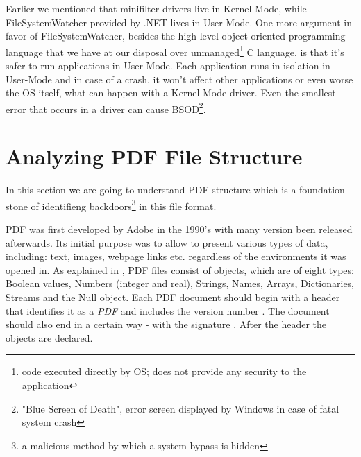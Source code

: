 Earlier we mentioned that minifilter drivers live in Kernel-Mode, while FileSystemWatcher provided by .NET lives in User-Mode. One more argument in favor of FileSystemWatcher, besides the high level object-oriented programming language \CSharp that we have at our disposal over unmanaged\footnote{code executed directly by OS; does not provide any security to the application} C language, is that it's safer to run applications in User-Mode. Each application runs in isolation in User-Mode and in case of a crash, it won't affect other applications or even worse the OS itself, what can happen with a Kernel-Mode driver. Even the smallest error that occurs in a driver can cause BSOD\footnote{"Blue Screen of Death", error screen displayed by Windows in case of fatal system crash}. 

\newpage
\section{Analyzing PDF File Structure}
\label{section:pdfStructure}
In this section we are going to understand PDF structure which is a foundation stone of identifieng backdoors\footnote{a malicious method by which a system bypass is hidden} in this file format. \par
PDF was first developed by Adobe in the 1990's with many version been released afterwards. Its initial purpose was to allow to present various types of data, including: text, images, webpage links etc. regardless of the environments it was opened in. As explained in \cite{pdfReference}, PDF files consist of objects, which are of eight types: Boolean values, Numbers (integer and real), Strings, Names, Arrays, Dictionaries, Streams and the Null object. Each PDF document should begin with a header that identifies it as a \textit{PDF} and includes the version number . The document should also end in a certain way - with the signature . After the header the objects are declared.



